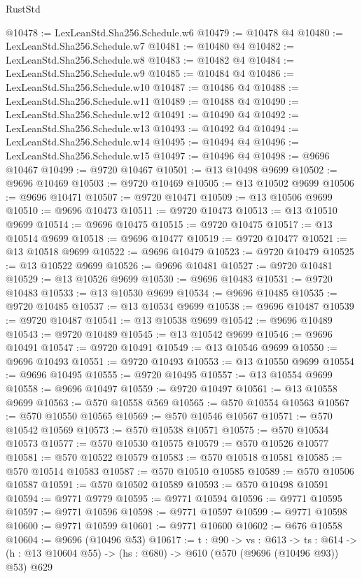 \begin{lexlean}{RustStd}
\begin{coremodule}
@10478 := LexLeanStd.Sha256.Schedule.w6
@10479 := @10478 @4
@10480 := LexLeanStd.Sha256.Schedule.w7
@10481 := @10480 @4
@10482 := LexLeanStd.Sha256.Schedule.w8
@10483 := @10482 @4
@10484 := LexLeanStd.Sha256.Schedule.w9
@10485 := @10484 @4
@10486 := LexLeanStd.Sha256.Schedule.w10
@10487 := @10486 @4
@10488 := LexLeanStd.Sha256.Schedule.w11
@10489 := @10488 @4
@10490 := LexLeanStd.Sha256.Schedule.w12
@10491 := @10490 @4
@10492 := LexLeanStd.Sha256.Schedule.w13
@10493 := @10492 @4
@10494 := LexLeanStd.Sha256.Schedule.w14
@10495 := @10494 @4
@10496 := LexLeanStd.Sha256.Schedule.w15
@10497 := @10496 @4
@10498 := @9696 @10467
@10499 := @9720 @10467
@10501 := @13 @10498 @9699
@10502 := @9696 @10469
@10503 := @9720 @10469
@10505 := @13 @10502 @9699
@10506 := @9696 @10471
@10507 := @9720 @10471
@10509 := @13 @10506 @9699
@10510 := @9696 @10473
@10511 := @9720 @10473
@10513 := @13 @10510 @9699
@10514 := @9696 @10475
@10515 := @9720 @10475
@10517 := @13 @10514 @9699
@10518 := @9696 @10477
@10519 := @9720 @10477
@10521 := @13 @10518 @9699
@10522 := @9696 @10479
@10523 := @9720 @10479
@10525 := @13 @10522 @9699
@10526 := @9696 @10481
@10527 := @9720 @10481
@10529 := @13 @10526 @9699
@10530 := @9696 @10483
@10531 := @9720 @10483
@10533 := @13 @10530 @9699
@10534 := @9696 @10485
@10535 := @9720 @10485
@10537 := @13 @10534 @9699
@10538 := @9696 @10487
@10539 := @9720 @10487
@10541 := @13 @10538 @9699
@10542 := @9696 @10489
@10543 := @9720 @10489
@10545 := @13 @10542 @9699
@10546 := @9696 @10491
@10547 := @9720 @10491
@10549 := @13 @10546 @9699
@10550 := @9696 @10493
@10551 := @9720 @10493
@10553 := @13 @10550 @9699
@10554 := @9696 @10495
@10555 := @9720 @10495
@10557 := @13 @10554 @9699
@10558 := @9696 @10497
@10559 := @9720 @10497
@10561 := @13 @10558 @9699
@10563 := @570 @10558 @569
@10565 := @570 @10554 @10563
@10567 := @570 @10550 @10565
@10569 := @570 @10546 @10567
@10571 := @570 @10542 @10569
@10573 := @570 @10538 @10571
@10575 := @570 @10534 @10573
@10577 := @570 @10530 @10575
@10579 := @570 @10526 @10577
@10581 := @570 @10522 @10579
@10583 := @570 @10518 @10581
@10585 := @570 @10514 @10583
@10587 := @570 @10510 @10585
@10589 := @570 @10506 @10587
@10591 := @570 @10502 @10589
@10593 := @570 @10498 @10591
@10594 := @9771 @9779
@10595 := @9771 @10594
@10596 := @9771 @10595
@10597 := @9771 @10596
@10598 := @9771 @10597
@10599 := @9771 @10598
@10600 := @9771 @10599
@10601 := @9771 @10600
@10602 := @676 @10558
@10604 := @9696 (@10496 @53)
@10617 := {t : @90} ->
  {vs : @613} ->
  {ts : @614} -> (h : @13 @10604 @55) -> (hs : @680) -> @610 (@570 (@9696 (@10496 @93)) @53) @629

\end{coremodule}
\end{lexlean}
